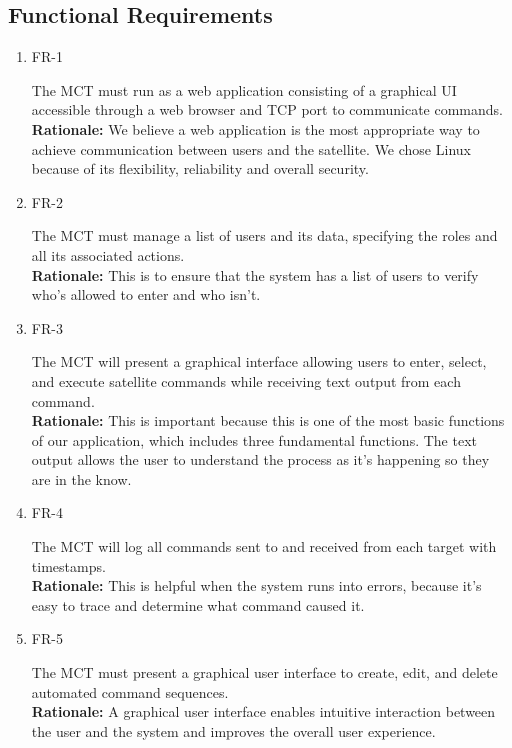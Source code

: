 \documentclass[12pt]{article}
\begin{document}
\subsection{Functional Requirements}
\begin{enumerate}
    \item{FR-1\\}
    
    The MCT must run as a web application consisting of a graphical UI accessible through a web browser and TCP port to communicate commands. \\
    \textbf{Rationale:} We believe a web application is the most appropriate way to achieve communication between users and the satellite. We chose Linux because of its flexibility, reliability and overall security.
    
    \item{FR-2\\}
    
    The MCT must manage a list of users and its data, specifying the roles and all its associated actions. \\
    \textbf{Rationale:} This is to ensure that the system has a list of users to verify who’s allowed to enter and who isn’t. 

    \item{FR-3\\}
    

    The MCT will present a graphical interface allowing users to enter, select, and execute satellite commands while receiving text output from each command. \\
    \textbf{Rationale:} This is important because this is one of the most basic functions of our application, which includes three fundamental functions. The text output allows the user to understand the process as it’s happening so they are in the know. 

    \item{FR-4\\}
    
    The MCT will log all commands sent to and received from each target with timestamps. \\
    \textbf{Rationale:} This is helpful when the system runs into errors, because it’s easy to trace and determine what command caused it. 

    \item{FR-5\\}
    
    The MCT must present a graphical user interface to create, edit, and delete automated command sequences. \\
    \textbf{Rationale:} A graphical user interface enables intuitive interaction between the user and the system and improves the overall user experience. 


\end{enumerate}
\end{document}
